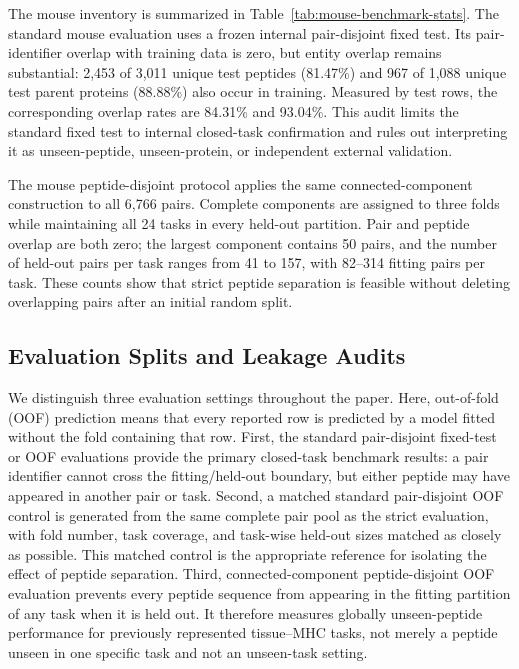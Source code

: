 The mouse inventory is summarized in Table~\ref{tab:mouse-benchmark-stats}. The standard mouse evaluation uses a frozen internal pair-disjoint fixed test. Its pair-identifier overlap with training data is zero, but entity overlap remains substantial: 2,453 of 3,011 unique test peptides (81.47\%) and 967 of 1,088 unique test parent proteins (88.88\%) also occur in training. Measured by test rows, the corresponding overlap rates are 84.31\% and 93.04\%. This audit limits the standard fixed test to internal closed-task confirmation and rules out interpreting it as unseen-peptide, unseen-protein, or independent external validation.

The mouse peptide-disjoint protocol applies the same connected-component construction to all 6,766 pairs. Complete components are assigned to three folds while maintaining all 24 tasks in every held-out partition. Pair and peptide overlap are both zero; the largest component contains 50 pairs, and the number of held-out pairs per task ranges from 41 to 157, with 82--314 fitting pairs per task. These counts show that strict peptide separation is feasible without deleting overlapping pairs after an initial random split.

\subsection{Evaluation Splits and Leakage Audits}

We distinguish three evaluation settings throughout the paper. Here, out-of-fold (OOF) prediction means that every reported row is predicted by a model fitted without the fold containing that row. First, the standard pair-disjoint fixed-test or OOF evaluations provide the primary closed-task benchmark results: a pair identifier cannot cross the fitting/held-out boundary, but either peptide may have appeared in another pair or task. Second, a matched standard pair-disjoint OOF control is generated from the same complete pair pool as the strict evaluation, with fold number, task coverage, and task-wise held-out sizes matched as closely as possible. This matched control is the appropriate reference for isolating the effect of peptide separation. Third, connected-component peptide-disjoint OOF evaluation prevents every peptide sequence from appearing in the fitting partition of any task when it is held out. It therefore measures globally unseen-peptide performance for previously represented tissue--MHC tasks, not merely a peptide unseen in one specific task and not an unseen-task setting.

